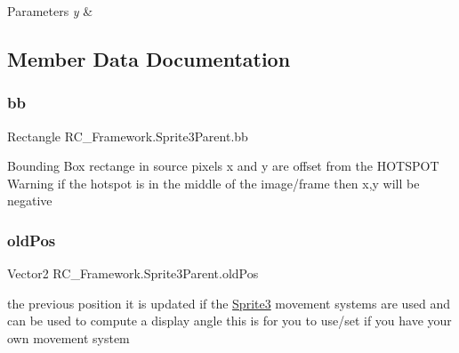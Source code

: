 \begin{DoxyParams}{Parameters}
{\em y} & \\
\hline
\end{DoxyParams}


\subsection{Member Data Documentation}
\mbox{\label{class_r_c___framework_1_1_sprite3_parent_af4043faa686325df81a690475feed4d8}} 
\subsubsection{\texorpdfstring{bb}{bb}}
{\footnotesize\ttfamily Rectangle R\+C\+\_\+\+Framework.\+Sprite3\+Parent.\+bb\hspace{0.3cm}{\ttfamily [protected]}}



Bounding Box rectange in source pixels x and y are offset from the H\+O\+T\+S\+P\+OT Warning if the hotspot is in the middle of the image/frame then x,y will be negative 

\mbox{\label{class_r_c___framework_1_1_sprite3_parent_a81a19273a375b067b83c5e01909bc576}} 
\subsubsection{\texorpdfstring{old\+Pos}{oldPos}}
{\footnotesize\ttfamily Vector2 R\+C\+\_\+\+Framework.\+Sprite3\+Parent.\+old\+Pos}



the previous position it is updated if the \mbox{\hyperlink{class_r_c___framework_1_1_sprite3}{Sprite3}} movement systems are used and can be used to compute a display angle this is for you to use/set if you have your own movement system 

\mbox{\label{class_r_c___framework_1_1_sprite3_parent_af83a86a2944aec373fe87a170f3d7e2c}} 
